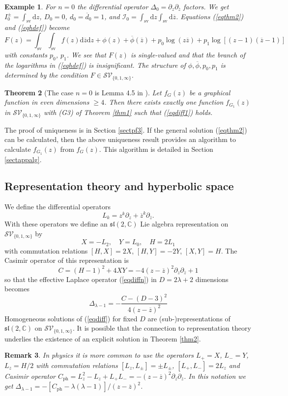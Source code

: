 \documentclass[oneside]{amsart}
\newcommand{\CC}{{\mathbb C}}
\newcommand{\sL}{\mathfrak{sl}}
\newcommand{\dd}{\mathrm{d}}
\newcommand{\ddd}{{\overline{d}}}
\newcommand{\zz}{{\overline{z}}}
\newcommand{\sI}{\mathcal{I}}
\newcommand{\sS}{\mathcal{S}}
\newcommand{\sV}{\mathcal{V}}
\newcommand{\intsv}{\int_\mathrm{sv}}
\theoremstyle{plain}
\newtheorem{thm}{Theorem}
\newtheorem{remark}[thm]{Remark}
\newtheorem{ex}[thm]{Example}
\begin{document}
\begin{ex}
For $n=0$ the differential operator $\Delta_0=\partial_z\partial_\zz$ factors.
We get $I_0^\pm=\intsv\dd z$, $D_0=0$, $d_0=\ddd_0=1$, and $\sI_0=\intsv\dd z\intsv\dd\zz$. Equations (\ref{eqthm2}) and (\ref{eqhdef}) become
$$
F(z)=\intsv\intsv f(z)\dd\zz\dd z+\phi(z)+\overline{\phi}(\zz)+p_0\log(z\zz)+p_1\log[(z-1)(\zz-1)]
$$
with constants $p_0$, $p_1$. We see that $F(z)$ is single-valued and that the branch of the logarithms in (\ref{eqhdef}) is insignificant.
The structure of $\phi,\overline{\phi},p_0,p_1$ is determined by the condition $F\in\sS\sV_{\{0,1,\infty\}}$.
\end{ex}

\begin{thm}[The case $n=0$ is Lemma 4.5 in \cite{numfunct}]\label{thm3}
Let $f_G(z)$ be a graphical function in even dimensions $\geq4$.
Then there exists exactly one function $f_{G_1}(z)$ in $\sS\sV_{\{0,1,\infty\}}$ with (G3) of Theorem \ref{thm1} such that (\ref{eqdiff1}) holds.
\end{thm}
The proof of uniqueness is in Section \ref{sectpf3}. If the general solution (\ref{eqthm2}) can be calculated, then the above uniqueness result provides
an algorithm to calculate $f_{G_1}(z)$ from $f_G(z)$. This algorithm is detailed in Section \ref{sectappalg}.

\subsection{Representation theory and hyperbolic space}\label{sectrep}
We define the differential operators
$$
L_k=z^k\partial_z+\zz^k\partial_\zz.
$$
With these operators we define an $\sL(2,\CC)$ Lie algebra representation on $\sS\sV_{\{0,1,\infty\}}$ by
\begin{equation}
X=-L_2,\quad Y=L_0,\quad H=2L_1
\end{equation}
with commutation relations $[H,X]=2X$, $[H,Y]=-2Y$, $[X,Y]=H$. The Casimir operator of this representation is
$$
C=(H-1)^2+4XY=-4(z-\zz)^2\partial_z\partial_\zz+1
$$
so that the effective Laplace operator (\ref{eqdiffn}) in $D=2\lambda+2$ dimensions becomes
$$
\Delta_{\lambda-1}=-\frac{C-(D-3)^2}{4(z-\zz)^2}
$$
Homogeneous solutions of (\ref{eqdiff}) for fixed $D$ are (sub-)representations of $\sL(2,\CC)$ on $\sS\sV_{\{0,1,\infty\}}$. It is possible that the connection to representation theory
underlies the existence of an explicit solution in Theorem \ref{thm2}.

\begin{remark}
In physics it is more common to use the operators $L_+=X$, $L_-=Y$, $L_z=H/2$ with commutation relations $[L_z,L_\pm]=\pm L_\pm$, $[L_+,L_-]=2L_z$ and Casimir operator
$C_{\mathrm{ph}}=L_z^2-L_z+L_+L_-=-(z-\zz)^2\partial_z\partial_\zz$. In this notation we get $\Delta_{\lambda-1}=-[C_{\mathrm{ph}}-\lambda(\lambda-1)]/(z-\zz)^2$.
\end{remark}
\end{document}
